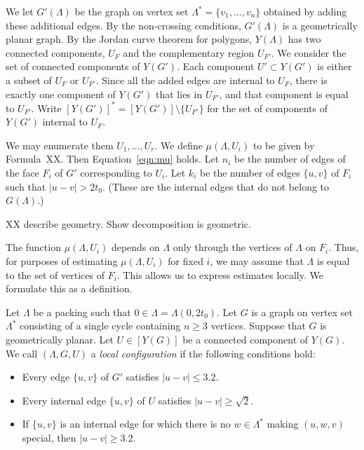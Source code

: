 We let $G'(\Lambda)$ be the graph on vertex set $\Lambda^*=\{v_1,\ldots,v_n\}$ obtained by adding these additional edges.  By the non-crossing
conditions, $G'(\Lambda)$ is a geometrically planar graph.  
By the Jordan curve theorem for polygons, $Y(\Lambda)$ has two connected 
components,
$U_F$ and the complementary region $U_{F'}$.
We consider the set of connected components of $Y(G')$.  Each
component $U'\subset Y(G')$ is either a subset of $U_F$ or $U_{F'}$.
Since all the added edges are internal to $U_F$, there is exactly
one component of $Y(G')$ that lies in $U_{F'}$, and that component
is equal to $U_{F'}$.  Write $[Y(G')]^* = [Y(G')]\setminus\{U_{F'}\}$
for the set of components of $Y(G')$ internal to $U_F$.

We may enumerate them $U_1,\ldots,U_r$.  We define
$\mu(\Lambda,U_i)$ to be given by Formula~XX.  Then
Equation~\ref{eqn:mu} holds.  Let $n_i$ be the number of edges of the face
$F_i$ of $G'$ corresponding to $U_i$.  Let $k_i$ be the number of edges
$\{u,v\}$
of $F_i$ such that $|u-v|> 2t_0$. (These are the internal edges that do not
belong to $G(\Lambda)$.)  

XX describe geometry. Show decomposition is geometric.

The function $\mu(\Lambda,U_i)$ depends on $\Lambda$ only through
the vertices of $\Lambda$ on $F_i$.  Thus, for purposes of estimating
$\mu(\Lambda,U_i)$ for fixed $i$, we may assume that $\Lambda$
is equal to the set of vertices of $F_i$.  This allows us to express
estimates locally.  We formulate this as a definition.

\begin{definition}
Let $\Lambda$ be a packing such that $0\in\Lambda=\Lambda(0,2t_0)$.  
Let $G$ is a graph on vertex set $\Lambda^*$ 
consisting
of a single cycle containing $n\ge 3$ vertices.  
Suppose that $G$ is geometrically planar. 
Let $U\in [Y(G)]$ be a connected component of $Y(G)$.  
We call $(\Lambda,G,U)$ a {\it local configuration} if the
following conditions hold:
\begin{itemize}
\item Every edge $\{u,v\}$ of $G'$ satisfies $|u-v|\le 3.2$.
\item Every internal edge
$\{u,v\}$ of  $U$ satisfies $|u-v|\ge \sqrt2$.
\item If $\{u,v\}$ is an internal edge for which there is no
$w\in\Lambda^*$ making $(u,w,v)$ special, then
$|u-v|\ge 3.2$.


\end{itemize}
\end{definition}

